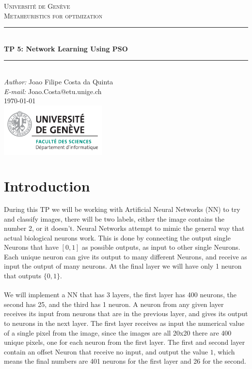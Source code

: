 \documentclass[a4paper]{article}
\makeatletter
\newcommand\TPid{5}
\newcommand\TPname{Network Learning Using PSO}
\newcommand\Firstname{Joao Filipe}
\newcommand\Familyname{Costa da Quinta}
\newcommand\Email{Joao.Costa@etu.unige.ch}
\makeatother
\begin{document}
\begin{titlepage}

\newcommand{\HRule}{\rule{\linewidth}{0.5mm}} 							%

\center 
 
\textsc{\LARGE Université de Genève}\\[1cm]

\textsc{\Large Metaheuristics for optimization}\\[0.2cm]									%
\HRule \\[0.8cm]
{ \huge \bfseries TP \TPid : \TPname}\\[0.7cm]								%
\HRule \\[2cm]
\large
\emph{Author:} \Firstname \; \Familyname\\[0.5cm]		
\emph{E-mail:} {\color{blue}\Email}\\[7cm]		
{\large \today}\\[2cm]
\includegraphics[width=0.4\textwidth]{images/unige_csd.png}\\[1cm] 	%
\vfill 
\end{titlepage}


\newpage
\section{Introduction}
During this TP we will be working with Artificial Neural Networks (NN) to try and classify images, there will be two labels, either the image contains the number 2, or it doesn't. Neural Networks attempt to mimic the general way that actual biological neurons work. This is done by connecting the output single Neurons that have $[0,1]$ as possible outputs, as input to other single Neurons. Each unique neuron can give its output to many different Neurons, and receive as input the output of many neurons. At the final layer we will have only 1 neuron that outputs $\{0,1\}$.\\\\ We will implement a NN that has 3 layers, the first layer has 400 neurons, the second has 25, and the third has 1 neuron. A neuron from any given layer receives its input from neurons that are in the previous layer, and gives its output to neurons in the next layer. The first layer receives as input the numerical value of a single pixel from the image, since the images are all 20x20 there are 400 unique pixels, one for each neuron from the first layer. The first and second layer contain an offset Neuron that receive no input, and output the value $1$, which means the final numbers are 401 neurons for the first layer and 26 for the second.
\end{document}
